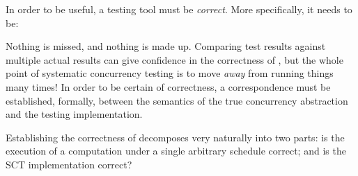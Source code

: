 In order to be useful, a testing tool must be \emph{correct}. More
specifically, it needs to be:



Nothing is missed, and nothing is made up. Comparing test results
against multiple actual results can give confidence in the correctness
of \dejafu{}, but the whole point of systematic concurrency testing is
to move \emph{away} from running things many times! In order to be
certain of correctness, a correspondence must be established,
formally, between the semantics of the true concurrency abstraction
and the testing implementation.

Establishing the correctness of \dejafu{} decomposes very naturally
into two parts: is the execution of a computation under a single
arbitrary schedule correct; and is the SCT implementation correct?
